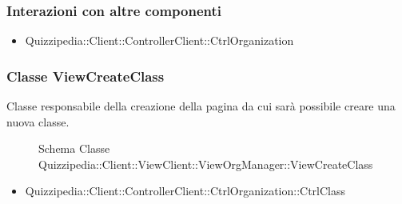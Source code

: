 \subsubsection{Interazioni con altre componenti}
\begin{itemize}
\item Quizzipedia::Client::ControllerClient::CtrlOrganization
\end{itemize}
\subsubsection{Classe ViewCreateClass}
Classe responsabile della creazione della pagina da cui sarà possibile creare una nuova classe.
\begin{figure}[H]
\centering
\noindent{}
\caption[Schema Classe ViewCreateClass]{Schema Classe Quizzipedia::Client::ViewClient::ViewOrgManager::ViewCreateClass}
\end{figure}
\begin{itemize}
\item Quizzipedia::Client::ControllerClient::CtrlOrganization::CtrlClass
\end{itemize}
